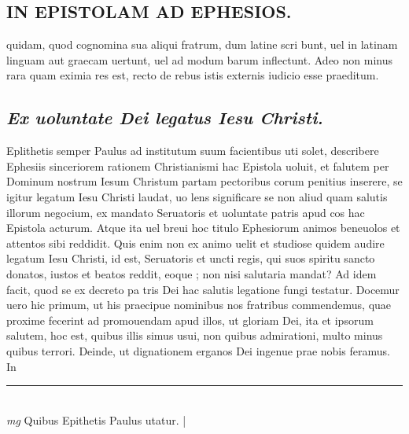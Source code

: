 \documentclass{article}
\begin{document}
\begin{pages}
\section*{IN EPISTOLAM AD EPHESIOS.  }\pstart quidam, quod cognomina sua aliqui fratrum, dum latine scri bunt, uel in latinam linguam aut graecam uertunt, uel ad modum barum inflectunt. Adeo non minus rara quam eximia res est, recto de rebus istis externis iudicio esse praeditum.   \pend
{}
{}
\subsection*{\textit{Ex uoluntate Dei legatus Iesu Christi. }}\pstart Eplithetis semper Paulus ad institutum suum facientibus uti solet, describere Ephesiis sinceriorem rationem Christianismi hac Epistola uoluit, et falutem per Dominum nostrum Iesum Christum partam pectoribus   corum penitius inserere, se igitur legatum Iesu Christi laudat, uo lens significare se non aliud quam salutis illorum negocium, ex mandato Seruatoris et uoluntate patris apud cos hac Epistola acturum.  Atque  ita uel breui hoc titulo Ephesiorum animos beneuolos et attentos sibi reddidit.  Quis enim non ex animo uelit et studiose quidem audire legatum Iesu Christi, id est, Seruatoris et uncti regis, qui suos spiritu sancto donatos, iustos et beatos reddit, eoque ; non nisi salutaria mandat? Ad idem facit, quod se ex decreto pa tris Dei hac salutis legatione fungi testatur.   \pend\pstart Docemur uero hic primum, ut his praecipue nominibus nos fratribus commendemus, quae proxime fecerint ad promouendam apud illos, ut gloriam Dei, ita et ipsorum salutem, hoc est, quibus illis simus usui, non quibus admirationi, multo minus quibus terrori.  Deinde, ut dignationem erganos Dei ingenue prae nobis feramus.  In\pend
\vspace{0.5cm}\noindent
\vspace{0.2cm}\rule{1cm}{0.2pt}\\ 
\hspace{0.2cm}\textit{mg}
\footnotesize Quibus Epithetis Paulus utatur.  
\normalsize| 

\end{pages}
\end{document}
